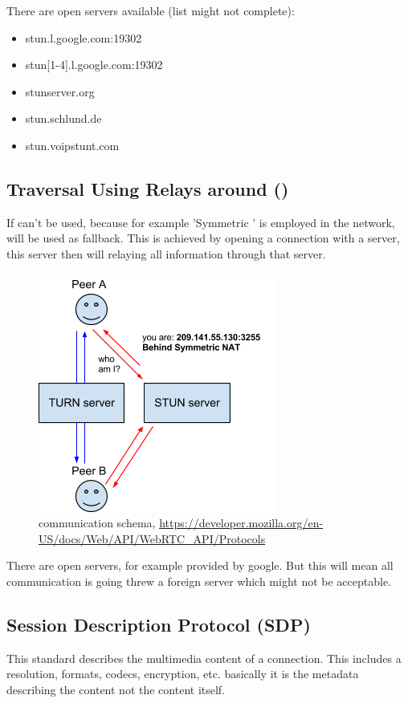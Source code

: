 There are open  servers available (list might not complete):
\begin{itemize}
	\item stun.l.google.com:19302
	\item stun[1-4].l.google.com:19302
	\item stunserver.org
	\item stun.schlund.de
	\item stun.voipstunt.com
\end{itemize}

\subsection{Traversal Using Relays around  ()}
If  can't be used, because for example 'Symmetric ' is employed in the network,  will be used as fallback. This is achieved by opening a connection with a  server, this server then will relaying all information through that server.

\begin{figure}[H]
	\includegraphics[scale=0.5]{images/webrtc-turn.png}
	\centering
	\caption{ communication schema, \url{https://developer.mozilla.org/en-US/docs/Web/API/WebRTC_API/Protocols}}
	\label{fig:TURN}
\end{figure}

There are open  servers, for example provided by google. But this will mean all communication is going threw a foreign server which might not be acceptable.

\subsection{Session Description Protocol (SDP)}
This standard describes the multimedia content of a connection. This includes a resolution, formats, codecs, encryption, etc. basically it is the metadata describing the content not the content itself.


